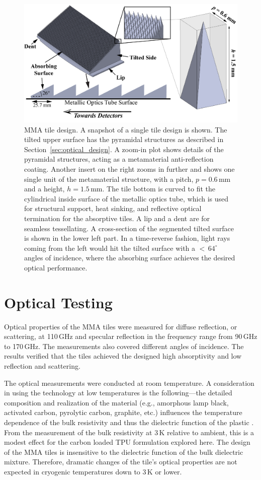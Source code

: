 \begin{figure}[t]
    \centering
    \includegraphics[width = .9\textwidth]{Figures/tile_design.png}
    \caption{MMA tile design. A snapshot of a single tile design is shown. The tilted upper surface has the pyramidal structures as described in Section~\ref{sec:optical_design}. A zoom-in plot shows details of the pyramidal structures, acting as a metamaterial anti-reflection coating. Another insert on the right zooms in further and shows one single unit of the metamaterial structure, with a pitch, $p =0.6\,$mm and a height, $h = 1.5\,$mm. The tile bottom is curved to fit the cylindrical inside surface of the metallic optics tube, which is used for structural support, heat sinking, and reflective optical termination for the absorptive tiles. A lip and a dent are for seamless tessellating. A cross-section of the segmented tilted surface is shown in the lower left part. In a time-reverse fashion, light rays coming from the left would hit the tilted surface with a $<$\,$64^{\circ}$ angles of incidence, where the absorbing surface achieves the desired optical performance.}
    \label{fig:tile_design}
\end{figure}

\section{Optical Testing}
\label{sec:optical_testing}

Optical properties of the MMA tiles were measured for diffuse reflection, or scattering, at 110\,GHz and specular reflection in the frequency range from 90\,GHz to 170\,GHz. The measurements also covered different angles of incidence. The results verified that the tiles achieved the designed high absorptivity and low reflection and scattering.

The optical measurements were conducted at room temperature. A consideration in using the technology at low temperatures is the following---the detailed composition and realization of the material (e.g., amorphous lamp black, activated carbon, pyrolytic carbon, graphite, etc.) influences the temperature dependence of the bulk resistivity and thus the dielectric function of the plastic \cite{Smith1956,Sihvola2008}. From the measurement of the bulk resistivity at 3\,K relative to ambient, this is a modest effect for the carbon loaded TPU formulation explored here. The design of the MMA tiles is insensitive to the dielectric function of the bulk dielectric mixture. Therefore, dramatic changes of the tile's optical properties are not expected in cryogenic temperatures down to 3\,K or lower. 

